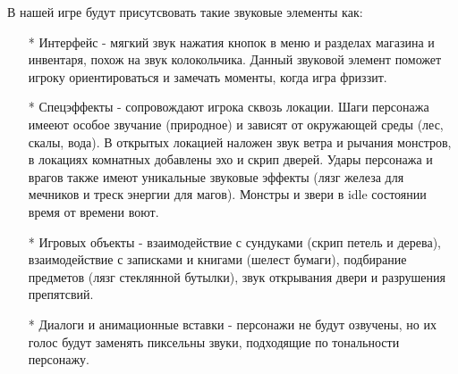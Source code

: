 \documentclass{article}
\begin{document}
В нашей игре будут присутсвовать такие звуковые элементы как:
\begin{itemize}
\item[*] Интерфейс - мягкий звук нажатия кнопок в меню и разделах магазина и инвентаря, похож на звук колокольчика. Данный звуковой элемент поможет игроку ориентироваться и замечать моменты, когда игра фриззит.
\item[*]  Спецэффекты - сопровождают игрока сквозь локации. Шаги персонажа имееют особое звучание (природное) и зависят от окружающей среды (лес, скалы, вода). В открытых локацией наложен звук ветра и рычания монстров, в локациях комнатных добавлены эхо и скрип дверей. Удары персонажа и врагов также имеют уникальные звуковые эффекты (лязг железа для мечников и треск энергии для магов). Монстры и звери в idle состоянии время от времени воют.
\item[*] Игровых объекты - взаимодействие с сундуками (скрип петель и дерева), взаимодействие с записками и книгами (шелест бумаги), подбирание предметов (лязг стеклянной бутылки), звук открывания двери и разрушения препятсвий.
\item[*] Диалоги и анимационные вставки - персонажи не будут озвучены, но их голос будут заменять пиксельны звуки, подходящие по тональности персонажу.
\end{itemize}
\end{document}
